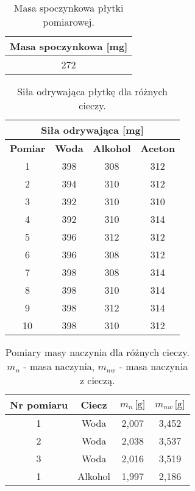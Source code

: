 \documentclass[a4paper,12pt]{article}
\begin{document}
\begin{table}[H]
    \centering
    \begin{tabular}{|c|}
        \hline
        \textbf{Masa spoczynkowa [mg]} \\
        \hline
        272 \\
        \hline
    \end{tabular}
    \caption{Masa spoczynkowa płytki pomiarowej.}
    \label{tab:masa_spoczynkowa}
\end{table}

\begin{table}[H]
    \centering
    \begin{tabular}{|c|c|c|c|}
        \hline
        \multicolumn{4}{|c|}{\textbf{Siła odrywająca [mg]}} \\
        \hline
        \textbf{Pomiar} & \textbf{Woda} & \textbf{Alkohol} & \textbf{Aceton} \\
        \hline
        1 & 398 & 308 & 312 \\ %
        \hline
        2 & 394 & 310 & 312 \\ %
        \hline
        3 & 392 & 310 & 310 \\ %
        \hline
        4 & 392 & 310 & 314 \\ %
        \hline
        5 & 396 & 312 & 312 \\ %
        \hline
        6 & 396 & 308 & 312 \\ %
        \hline
        7 & 398 & 308 & 314 \\ %
        \hline
        8 & 398 & 310 & 314 \\ %
        \hline
        9 & 398 & 312 & 314 \\ %
        \hline
        10 & 398 & 310 & 312 \\ %
        \hline
    \end{tabular}
    \caption{Siła odrywająca płytkę dla różnych cieczy.}
    \label{tab:sila_odrywania}
\end{table}

\begin{table}[H]
    \centering
    \begin{tabular}{|c|c|c|c|}
        \hline
        \textbf{Nr pomiaru} & \textbf{Ciecz} & $m_n\,\text{[g]}$ & $m_{nw}\,\text{[g]}$ \\
        \hline
        1 & Woda & 2{,}007 & 3{,}452 \\
        2 & Woda & 2{,}038 & 3{,}537 \\
        3 & Woda & 2{,}016 & 3{,}519 \\
        \hline
        1 & Alkohol & 1{,}997 & 2{,}186 \\
        \hline
    \end{tabular}
    \caption{Pomiary masy naczynia dla różnych cieczy. $m_n$ - masa naczynia, $m_{nw}$ - masa naczynia z cieczą.}
    \label{tab:stalagmometr}
\end{table}
\end{document}

